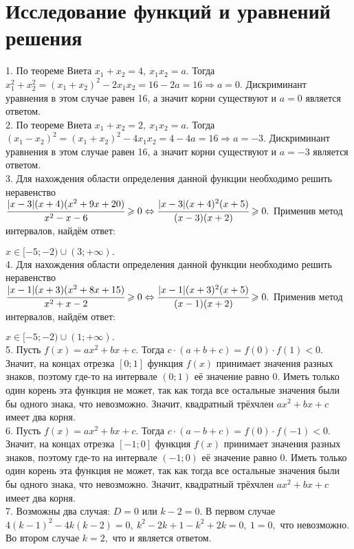 \section{Исследование функций и уравнений решения}
1. По теореме Виета $x_1+x_2=4,\ x_1x_2=a.$ Тогда $x_1^2+x_2^2=(x_1+x_2)^2-2x_1x_2=16-2a=16\Rightarrow a=0.$ Дискриминант уравнения в этом случае равен 16, а значит корни существуют и $a=0$ является ответом.\\
2. По теореме Виета $x_1+x_2=2,\ x_1x_2=a.$ Тогда $(x_1-x_2)^2=(x_1+x_2)^2-4x_1x_2=4-4a=16\Rightarrow a=-3.$ Дискриминант уравнения в этом случае равен 16, а значит корни существуют и $a=-3$ является ответом.\\
3. Для нахождения области определения данной функции необходимо решить неравенство\\ $\cfrac{|x-3|(x+4)(x^2+9x+20)}{x^2-x-6}\geqslant0\Leftrightarrow
\cfrac{|x-3|(x+4)^2(x+5)}{(x-3)(x+2)}\geqslant0.$ Применив метод интервалов, найдём ответ:
\begin{figure}[ht!]
\end{figure}
$x\in[-5;-2)\cup(3;+\infty).$\\
4. Для нахождения области определения данной функции необходимо решить неравенство\\ $\cfrac{|x-1|(x+3)(x^2+8x+15)}{x^2+x-2}\geqslant0\Leftrightarrow
\cfrac{|x-1|(x+3)^2(x+5)}{(x-1)(x+2)}\geqslant0.$ Применив метод интервалов, найдём ответ:
\begin{figure}[ht!]
\end{figure}
$x\in[-5;-2)\cup(1;+\infty).$\\
5. Пусть $f(x)=ax^2+bx+c.$ Тогда $c\cdot(a+b+c)=f(0)\cdot f(1)<0.$ Значит, на концах отрезка $[0;1]$ функция $f(x)$ принимает значения разных знаков, поэтому где-то на интервале $(0;1)$ её значение равно 0. Иметь только один корень эта функция не может, так как тогда все остальные значения были бы одного знака, что невозможно. Значит, квадратный трёхчлен $ax^2+bx+c$ имеет два корня.\\
6. Пусть $f(x)=ax^2+bx+c.$ Тогда $c\cdot(a-b+c)=f(0)\cdot f(-1)<0.$ Значит, на концах отрезка $[-1;0]$ функция $f(x)$ принимает значения разных знаков, поэтому где-то на интервале $(-1;0)$ её значение равно 0. Иметь только один корень эта функция не может, так как тогда все остальные значения были бы одного знака, что невозможно. Значит, квадратный трёхчлен $ax^2+bx+c$ имеет два корня.\\
7. Возможны два случая: $D=0$ или $k-2=0.$ В первом случае $4(k-1)^2-4k(k-2)=0,\ k^2-2k+1-k^2+2k=0,\ 1=0,$ что невозможно. Во втором случае $k=2,$ что и является ответом.\\
